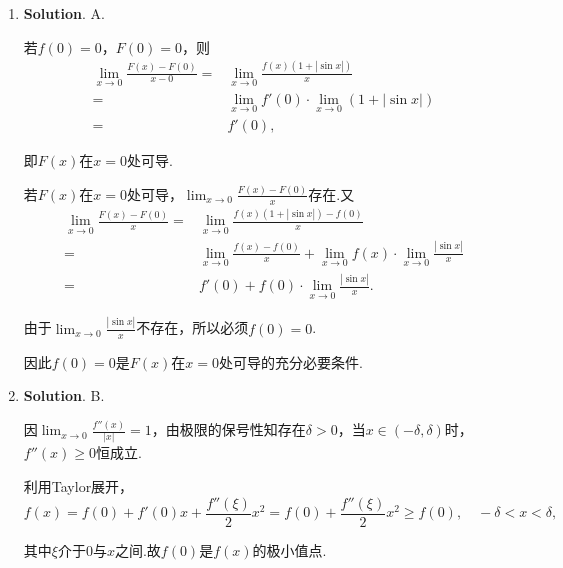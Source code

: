 \documentclass[../Main.tex]{subfiles}
\begin{document}
\begin{enumerate}
    \item \textbf{Solution}. A.

          若$f(0)=0$，$F(0)=0$，则
          \[
              \begin{aligned}
                  \lim_{x\to0}\frac{F(x)-F(0)}{x-0}= & \lim_{x\to0}\frac{f(x)(1+|\sin x|)}{x}                    \\
                  =                                  & \lim_{x\to0}f'(0)\cdot\lim_{x\to0}\left(1+|\sin x|\right) \\
                  =                                  & f'(0),
              \end{aligned}
          \]

          即$F(x)$在$x=0$处可导.

          若$F(x)$在$x=0$处可导，$\lim_{x\to0}\frac{F(x)-F(0)}{x}$存在.又
          \[
              \begin{aligned}
                  \lim_{x\to0}\frac{F(x)-F(0)}{x}= & \lim_{x\to0}\frac{f(x)(1+|\sin x|)-f(0)}{x}                                         \\
                  =                                & \lim_{x\to0}\frac{f(x)-f(0)}{x}+\lim_{x\to0}f(x)\cdot\lim_{x\to0}\frac{|\sin x|}{x} \\
                  =                                & f'(0)+f(0)\cdot\lim_{x\to0}\frac{|\sin x|}{x}.
              \end{aligned}
          \]

          由于$\lim_{x\to0}\frac{|\sin x|}{x}$不存在，所以必须$f(0)=0$.

          因此$f(0)=0$是$F(x)$在$x=0$处可导的充分必要条件.

    \item \textbf{Solution}. B.

          因$\lim_{x\to0}\frac{f''(x)}{|x|}=1$，由极限的保号性知存在$\delta>0$，当$x\in
              (-\delta,\delta)$时，$f''(x)\geq0$恒成立.

          利用Taylor展开，
          \[
              f(x)=f(0)+f'(0)x+\frac{f''(\xi)}{2}x^{2}=f(0)+\frac{f''(\xi)}{2}x^{2} \geq
              f(0), \quad -\delta<x<\delta,
          \]

          其中$\xi$介于$0$与$x$之间.故$f(0)$是$f(x)$的极小值点.
\end{enumerate}
\end{document}

